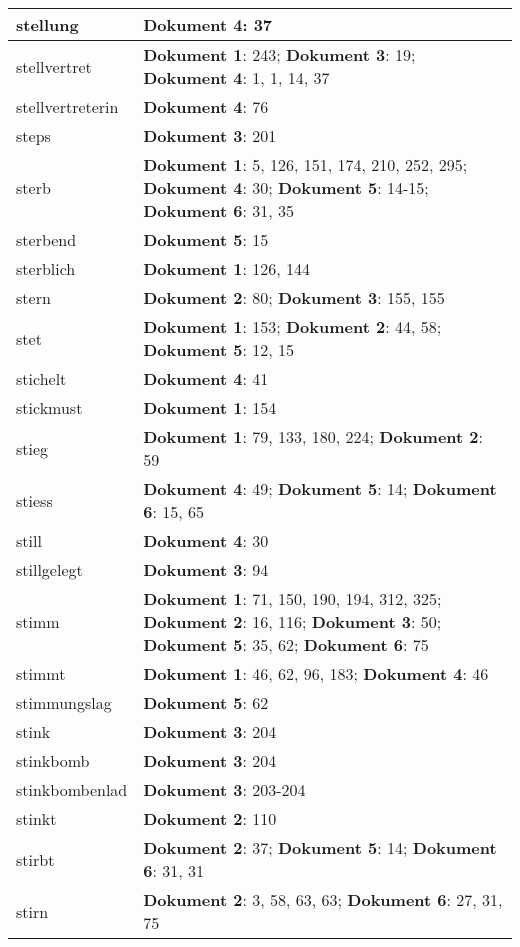 \documentclass[a5paper]{article}
\begin{document}
\begin{longtable}[l]{|l|p{3in}|}
\hline
stellung & \textbf{Dokument 4}: 37 \\
\hline
stellvertret & \textbf{Dokument 1}: 243; \textbf{Dokument 3}: 19; \textbf{Dokument 4}: 1, 1, 14, 37 \\
\hline
stellvertreterin & \textbf{Dokument 4}: 76 \\
\hline
steps & \textbf{Dokument 3}: 201 \\
\hline
sterb & \textbf{Dokument 1}: 5, 126, 151, 174, 210, 252, 295; \textbf{Dokument 4}: 30; \textbf{Dokument 5}: 14-15; \textbf{Dokument 6}: 31, 35 \\
\hline
sterbend & \textbf{Dokument 5}: 15 \\
\hline
sterblich & \textbf{Dokument 1}: 126, 144 \\
\hline
stern & \textbf{Dokument 2}: 80; \textbf{Dokument 3}: 155, 155 \\
\hline
stet & \textbf{Dokument 1}: 153; \textbf{Dokument 2}: 44, 58; \textbf{Dokument 5}: 12, 15 \\
\hline
stichelt & \textbf{Dokument 4}: 41 \\
\hline
stickmust & \textbf{Dokument 1}: 154 \\
\hline
stieg & \textbf{Dokument 1}: 79, 133, 180, 224; \textbf{Dokument 2}: 59 \\
\hline
stiess & \textbf{Dokument 4}: 49; \textbf{Dokument 5}: 14; \textbf{Dokument 6}: 15, 65 \\
\hline
still & \textbf{Dokument 4}: 30 \\
\hline
stillgelegt & \textbf{Dokument 3}: 94 \\
\hline
stimm & \textbf{Dokument 1}: 71, 150, 190, 194, 312, 325; \textbf{Dokument 2}: 16, 116; \textbf{Dokument 3}: 50; \textbf{Dokument 5}: 35, 62; \textbf{Dokument 6}: 75 \\
\hline
stimmt & \textbf{Dokument 1}: 46, 62, 96, 183; \textbf{Dokument 4}: 46 \\
\hline
stimmungslag & \textbf{Dokument 5}: 62 \\
\hline
stink & \textbf{Dokument 3}: 204 \\
\hline
stinkbomb & \textbf{Dokument 3}: 204 \\
\hline
stinkbombenlad & \textbf{Dokument 3}: 203-204 \\
\hline
stinkt & \textbf{Dokument 2}: 110 \\
\hline
stirbt & \textbf{Dokument 2}: 37; \textbf{Dokument 5}: 14; \textbf{Dokument 6}: 31, 31 \\
\hline
stirn & \textbf{Dokument 2}: 3, 58, 63, 63; \textbf{Dokument 6}: 27, 31, 75 \\

\end{longtable}
\end{document}

